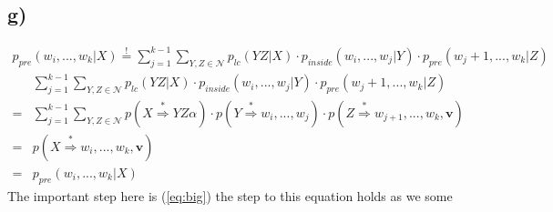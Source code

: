 \documentclass[a4paper,12pt]{ETHexercise}
\begin{document}
\subsection*{g)}
\begin{align*}
    p_{pre}(w_i,...,w_k|X) \stackrel{!}{=} \sum_{j=1}^{k-1}\sum_{Y,Z\in\mathcal{N}}p_{lc}(YZ|X)\cdot p_{inside}(w_i,...,w_j|Y)\cdot p_{pre}(w_j+1,...,w_k|Z)
\end{align*}
\begin{align}
    &\sum_{j=1}^{k-1}\sum_{Y,Z\in\mathcal{N}}p_{lc}(YZ|X)\cdot p_{inside}(w_i,...,w_j|Y)\cdot p_{pre}(w_j+1,...,w_k|Z)\\
    =&\sum_{j=1}^{k-1}\sum_{Y,Z\in\mathcal{N}}p(X \stackrel{*}{\Rightarrow} YZ\alpha)\cdot p(Y \stackrel{*}{\Rightarrow} w_i,...,w_j)\cdot p(Z \stackrel{*}{\Rightarrow} w_{j+1},...,w_k,\textbf{v})\\
    =&p(X \stackrel{*}{\Rightarrow} w_i,...,w_k,\textbf{v})\label{eq:big} \\
    =&p_{pre}(w_i,...,w_k|X)
\end{align}
The important step here is (\ref{eq:big}) the step to this equation holds as we some 
\end{document}
